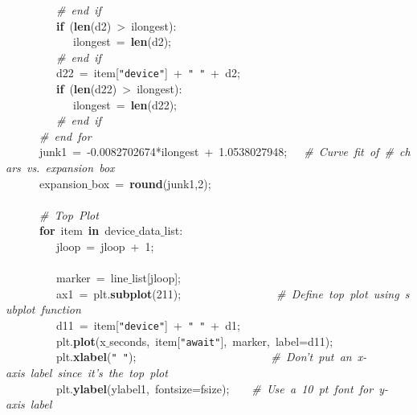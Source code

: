 \mbox{}\ \ \ \ \ \ \ \ \ \textit{\#\ end\ if} \\
\mbox{}\ \ \ \ \ \ \ \ \ \textbf{if}\ (\textbf{len}(d2)\ \textgreater{}\ ilongest): \\
\mbox{}\ \ \ \ \ \ \ \ \ \ \ \ ilongest\ =\ \textbf{len}(d2); \\
\mbox{}\ \ \ \ \ \ \ \ \ \textit{\#\ end\ if} \\
\mbox{}\ \ \ \ \ \ \ \ \ d22\ =\ item[\texttt{"{}device"{}}]\ +\ \texttt{"{}\ "{}}\ +\ d2; \\
\mbox{}\ \ \ \ \ \ \ \ \ \textbf{if}\ (\textbf{len}(d22)\ \textgreater{}\ ilongest): \\
\mbox{}\ \ \ \ \ \ \ \ \ \ \ \ ilongest\ =\ \textbf{len}(d22); \\
\mbox{}\ \ \ \ \ \ \ \ \ \textit{\#\ end\ if} \\
\mbox{}\ \ \ \ \ \ \textit{\#\ end\ for} \\
\mbox{}\ \ \ \ \ \ junk1\ =\ -0.0082702674*ilongest\ +\ 1.0538027948;\ \ \ \textit{\#\ Curve\ fit\ of\ \#\ chars\ vs.\ expansion\ box} \\
\mbox{}\ \ \ \ \ \ expansion$\_$box\ =\ \textbf{round}(junk1,2); \\
\mbox{}\ \ \ \ \ \  \\
\mbox{}\ \ \ \ \ \ \textit{\#\ Top\ Plot} \\
\mbox{}\ \ \ \ \ \ \textbf{for}\ item\ \textbf{in}\ device$\_$data$\_$list: \\
\mbox{}\ \ \ \ \ \ \ \ \ jloop\ =\ jloop\ +\ 1; \\
\mbox{}\ \ \ \ \ \ \ \ \  \\
\mbox{}\ \ \ \ \ \ \ \ \ marker\ =\ line$\_$list[jloop]; \\
\mbox{}\ \ \ \ \ \ \ \ \ ax1\ =\ plt.\textbf{subplot}(211);\ \ \ \ \ \ \ \ \ \ \ \ \ \ \ \ \ \textit{\#\ Define\ top\ plot\ using\ subplot\ function} \\
\mbox{}\ \ \ \ \ \ \ \ \ d11\ =\ item[\texttt{"{}device"{}}]\ +\ \texttt{"{}\ "{}}\ +\ d1; \\
\mbox{}\ \ \ \ \ \ \ \ \ plt.\textbf{plot}(x$\_$seconds,\ item[\texttt{"{}await"{}}],\ marker,\ label=d11); \\
\mbox{}\ \ \ \ \ \ \ \ \ plt.\textbf{xlabel}(\texttt{"{}\ "{}});\ \ \ \ \ \ \ \ \ \ \ \ \ \ \ \ \ \ \ \ \ \ \ \ \textit{\#\ Don't\ put\ an\ x-axis\ label\ since\ it's\ the\ top\ plot} \\
\mbox{}\ \ \ \ \ \ \ \ \ plt.\textbf{ylabel}(ylabel1,\ fontsize=fsize);\ \ \ \ \textit{\#\ Use\ a\ 10\ pt\ font\ for\ y-axis\ label} \\

